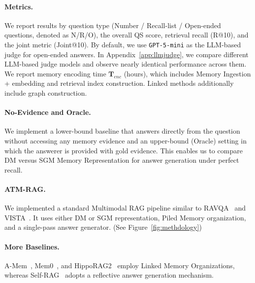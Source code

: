 \documentclass{article}
\theoremstyle{plain}
\theoremstyle{definition}
\theoremstyle{remark}
\begin{document}
\paragraph{Metrics.}
We report results by question type (Number / Recall-list / Open-ended questions, denoted as N/R/O), the overall QS score, retrieval recall (R@10), and the joint metric (Joint@10).
By default, we use \texttt{GPT-5-mini} as the LLM-based judge for open-ended answers.
In Appendix~\ref{app:llmjudge}, we compare different LLM-based judge models and observe nearly identical performance across them. We report memory encoding time $\mathbf{T}_{enc}$ (hours), which includes Memory Ingestion + embedding and retrieval index construction. Linked methods additionally include graph construction. 


\paragraph{No-Evidence and Oracle.}
We implement a lower-bound baseline that answers directly from the question without accessing any memory evidence and an upper-bound (Oracle) setting in which the answerer is provided with gold evidence. This enables us to compare DM versus SGM Memory Representation for answer generation under perfect recall.

\paragraph{ATM-RAG.}
We implemented a standard Multimodal RAG pipeline similar to RAVQA~\citep{preflmr} and VISTA~\citep{VISTA2024}. It uses either DM or SGM representation, Piled Memory organization, and a single-pass answer generator. (See Figure~\ref{fig:methdology}) %


\paragraph{More Baselines.} A-Mem~\cite{xu2025amem}, Mem0~\cite{chhikara2025mem0}, and HippoRAG2~\cite{HippoRAG2025} employ Linked Memory Organizations, whereas Self-RAG~\cite{asai2024selfrag} adopts a reflective answer generation mechanism. 
\end{document}
